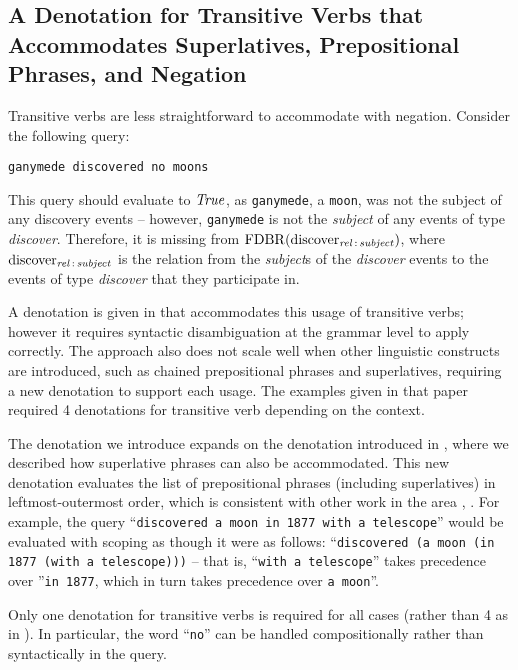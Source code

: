 \documentclass[../main.tex]{subfiles}
\begin{document}
\begin{refsection}
\subsection{A Denotation for Transitive Verbs that Accommodates Superlatives, Prepositional Phrases, and Negation}
\label{webist2020conf:tvs}

Transitive verbs are less straightforward to accommodate with negation.  Consider the following query:
\begin{center}
    \texttt{ganymede discovered no moons}
\end{center}
\noindent This query should evaluate to $\operatorname{\mathit{True}}$, as \texttt{ganymede}, a \texttt{moon}, was not the subject of any discovery events -- however, \texttt{ganymede} is not the \textit{subject} of any events of type \textit{discover}.  Therefore, it is missing from $\operatorname{FDBR}({\operatorname{discover}_{\operatorname{\mathit{rel}}\,:\,\operatorname{\mathit{subject}}}})$, where $\operatorname{discover}_{\operatorname{\mathit{rel}}\,:\,\operatorname{\mathit{subject}}}$ is the relation from the \textit{subject}s of the \textit{discover} events to the events of type \textit{discover} that they participate in.

A denotation is given in \cite{frostboulos2002} that accommodates this usage of transitive verbs; however it requires syntactic disambiguation at the grammar level to apply correctly.  The approach also does not scale well when other linguistic constructs are introduced, such as chained prepositional phrases and superlatives, requiring a new denotation to support each usage.  The examples given in that paper required 4 denotations for transitive verb depending on the context.

The denotation we introduce expands on the denotation introduced in \cite{frostpeelar2019}, where we described how superlative phrases can also be accommodated.  This new denotation evaluates the list of prepositional phrases (including superlatives) in leftmost-outermost order, which is consistent with other work in the area \cite{champollion2010quantification}, \cite{ferre2014squall}.  For example, the query ``\texttt{discovered a moon in 1877 with a telescope}'' would be evaluated with scoping as though it were as follows:
``\texttt{discovered (a moon (in 1877 (with a telescope)))} -- that is, ``\texttt{with a telescope}'' takes precedence over ''\texttt{in 1877}, which in turn takes precedence over \texttt{a moon}''.

Only one denotation for transitive verbs is required for all cases (rather than 4 as in \cite{frostboulos2002}). In particular, the word ``\texttt{no}'' can be handled compositionally rather than syntactically in the query.


\end{refsection}
\end{document}

